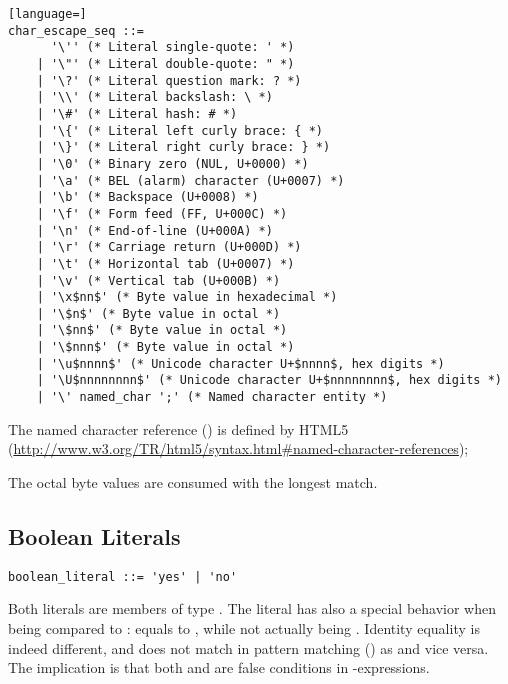 \syntax\begin{lstlisting}[language=]
char_escape_seq ::= 
      '\'' (* Literal single-quote: ' *)
    | '\"' (* Literal double-quote: " *)
    | '\?' (* Literal question mark: ? *)
    | '\\' (* Literal backslash: \ *)
    | '\#' (* Literal hash: # *)
    | '\{' (* Literal left curly brace: { *)
    | '\}' (* Literal right curly brace: } *)
    | '\0' (* Binary zero (NUL, U+0000) *)
    | '\a' (* BEL (alarm) character (U+0007) *)
    | '\b' (* Backspace (U+0008) *)
    | '\f' (* Form feed (FF, U+000C) *)
    | '\n' (* End-of-line (U+000A) *)
    | '\r' (* Carriage return (U+000D) *)
    | '\t' (* Horizontal tab (U+0007) *)
    | '\v' (* Vertical tab (U+000B) *)
    | '\x$nn$' (* Byte value in hexadecimal *) 
    | '\$n$' (* Byte value in octal *)
    | '\$nn$' (* Byte value in octal *)
    | '\$nnn$' (* Byte value in octal *)
    | '\u$nnnn$' (* Unicode character U+$nnnn$, hex digits *)
    | '\U$nnnnnnnn$' (* Unicode character U+$nnnnnnnn$, hex digits *)
    | '\' named_char ';' (* Named character entity *)
\end{lstlisting}

The named character reference () is defined by HTML5 (\url{http://www.w3.org/TR/html5/syntax.html#named-character-references});

The octal byte values are consumed with the longest match. 






\subsection{Boolean Literals}
\label{sec:booleanliterals}

\syntax\begin{lstlisting}
boolean_literal ::= 'yes' | 'no'
\end{lstlisting}

Both literals are members of type \lstinline@Boolean@. The \lstinline@no@ literal has also a special behavior when being compared to \lstinline@nil@: \lstinline@no@ equals to \lstinline@nil@, while not actually being \lstinline@nil@. Identity equality is indeed different, and  does not match in pattern matching () as  and vice versa. The implication is that both \lstinline@nil@ and \lstinline@no@ are false conditions in \lstinline@if@-expressions. 




